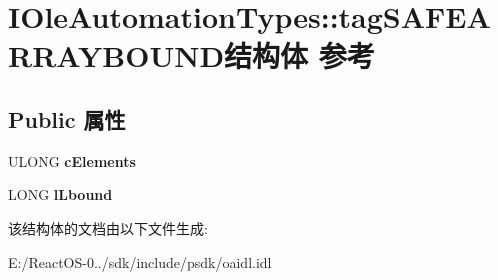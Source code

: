 \hypertarget{struct_i_ole_automation_types_1_1tag_s_a_f_e_a_r_r_a_y_b_o_u_n_d}{}\section{I\+Ole\+Automation\+Types\+:\+:tag\+S\+A\+F\+E\+A\+R\+R\+A\+Y\+B\+O\+U\+N\+D结构体 参考}
\label{struct_i_ole_automation_types_1_1tag_s_a_f_e_a_r_r_a_y_b_o_u_n_d}
\subsection*{Public 属性}
\begin{DoxyCompactItemize}
\item 
\mbox{\label{struct_i_ole_automation_types_1_1tag_s_a_f_e_a_r_r_a_y_b_o_u_n_d_a078d9b203733dd41489baa928a5122f7}} 
U\+L\+O\+NG {\bfseries c\+Elements}
\item 
\mbox{\label{struct_i_ole_automation_types_1_1tag_s_a_f_e_a_r_r_a_y_b_o_u_n_d_ac9df84ad4915f35c263c559e991ea463}} 
L\+O\+NG {\bfseries l\+Lbound}
\end{DoxyCompactItemize}


该结构体的文档由以下文件生成\+:\begin{DoxyCompactItemize}
\item 
E\+:/\+React\+O\+S-\/0../sdk/include/psdk/oaidl.\+idl\end{DoxyCompactItemize}
